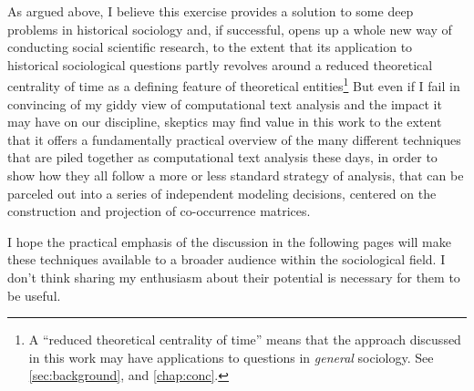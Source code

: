 As argued above, I believe this exercise provides a solution to some deep problems in historical sociology and, if successful, opens up a whole new way of conducting social scientific research, to the extent that its application to historical sociological questions partly revolves around a reduced theoretical centrality of time as a defining feature of theoretical entities\footnote{
    \label{foot:time}
    A ``reduced theoretical centrality of time'' means that the approach discussed in this work may have applications to questions in \emph{general} sociology. See \autoref{sec:background}, and \autoref{chap:conc}.
}
But even if I fail in convincing of my giddy view of computational text analysis and the impact it may have on our discipline, skeptics may find value in this work to the extent that it offers a fundamentally practical overview of the many different techniques that are piled together as computational text analysis these days, in order to show how they all follow a more or less standard strategy of analysis, that can be parceled out into a series of independent modeling decisions, centered on the construction and projection of co-occurrence matrices.

I hope the practical emphasis of the discussion in the following pages will make these techniques available to a broader audience within the sociological field.
I don't think sharing my enthusiasm about their potential is necessary for them to be useful.

